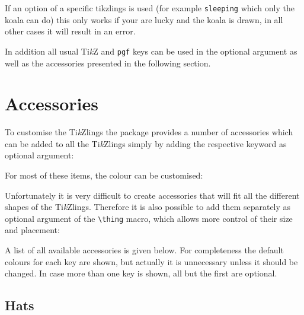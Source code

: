\documentclass[parskip=half]{scrartcl}
\newcommand{\TikZ}{Ti\emph{k}Z\xspace}
\newcommand{\tikzlings}{Ti\emph{k}Zlings\xspace}
\begin{document}
If an option of a specific tikzlings is used (for example \lstinline|sleeping| which only the koala can do) this only works if your are lucky and the koala is drawn, in all other cases it will result in an error. 

In addition all usual \TikZ and \lstinline|pgf| keys can be used in the optional argument as well as the accessories presented in the following section.

%
%
\clearpage
\section{Accessories}

To customise the \tikzlings the package provides a number of accessories which can be added to all the \tikzlings simply by adding the respective keyword as optional argument:

\begin{tcblisting}{}
\bear[hat]
\end{tcblisting}
 
For most of these items, the colour can be customised:

\begin{tcblisting}{}
\koala[crown=orange!50!yellow]
\end{tcblisting}

Unfortunately it is very difficult to create accessories that will fit all the different shapes of the \tikzlings. Therefore it is also possible to add them separately as optional argument of the \lstinline|\thing| macro, which allows more control of their size and placement:

\begin{tcblisting}{}
\owl
\thing[tophat,scale=1.5,yshift=-0.6cm,xshift=-0.05cm]
\end{tcblisting}

A list of all available accessories is given below. For completeness the default colours for each key are shown, but actually it is unnecessary unless it should be changed. In case more than one key is shown, all but the first are optional.

\subsection{Hats}

\begin{tcblisting}{}
\penguin[
	hat=blue!40!black
]
\end{tcblisting}
\end{document}
